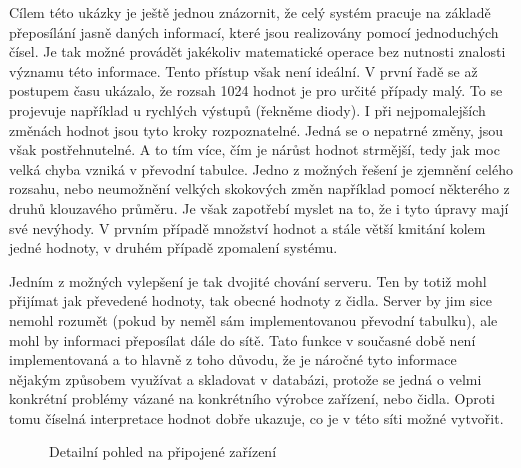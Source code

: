 Cílem této ukázky je ještě jednou znázornit, že celý systém pracuje na základě přeposílání jasně daných informací, které jsou realizovány pomocí jednoduchých čísel. Je tak možné provádět jakékoliv matematické operace bez nutnosti znalosti významu této informace. Tento přístup však není ideální. V první řadě se až postupem času ukázalo, že rozsah 1024 hodnot je pro určité případy malý. To se projevuje například u rychlých výstupů (řekněme diody). I při nejpomalejších změnách hodnot jsou tyto kroky rozpoznatelné. Jedná se o nepatrné změny, jsou však postřehnutelné. A to tím více, čím je nárůst hodnot strmější, tedy jak moc velká chyba vzniká v převodní tabulce. Jedno z možných řešení je zjemnění celého rozsahu, nebo neumožnění velkých skokových změn například pomocí některého z druhů klouzavého průměru. Je však zapotřebí myslet na to, že i tyto úpravy mají své nevýhody. V prvním případě množství hodnot a stále větší kmitání kolem jedné hodnoty, v druhém případě zpomalení systému.

Jedním z možných vylepšení je tak dvojité chování serveru. Ten by totiž mohl přijímat jak převedené hodnoty, tak obecné hodnoty z čidla. Server by jim sice nemohl rozumět (pokud by neměl sám implementovanou převodní tabulku), ale mohl by informaci přeposílat dále do sítě. Tato funkce v současné době není implementovaná a to hlavně z toho důvodu, že je náročné tyto informace nějakým způsobem využívat a skladovat v databázi, protože se jedná o velmi konkrétní problémy vázané na konkrétního výrobce zařízení, nebo čidla. Oproti tomu číselná interpretace hodnot dobře ukazuje, co je v této síti možné vytvořit.

\begin{figure}[h]
    \centering
	\caption{Detailní pohled na připojené zařízení}
	\label{fig:speedy2}
\end{figure}

